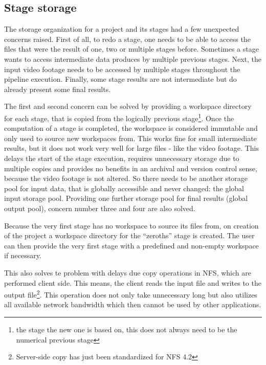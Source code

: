 \subsection{Stage storage}
\label{stage:workspace}

The storage organization for a project and its stages had a few unexpected concerns raised.
First of all, to redo a stage, one needs to be able to access the files that were the result of one, two or multiple stages before.
Sometimes a stage wants to access intermediate data produces by multiple previous stages.
Next, the input video footage needs to be accessed by multiple stages throughout the pipeline execution.
Finally, some stage results are not intermediate but do already present some final results.

The first and second concern can be solved by providing a workspace directory for each stage, that is copied from the logically previous stage\footnote{the stage the new one is based on, this does not always need to be the numerical previous stage}.
Once the computation of a stage is completed, the workspace is considered immutable and only used to source new workspaces from.
This works fine for small intermediate results, but it does not work very well for large files - like the video footage.
This delays the start of the stage execution, requires unnecessary storage due to multiple copies and provides no benefits in an archival and version control sense, because the video footage is not altered.
So there needs to be another storage pool for input data, that is globally accessible and never changed: the global input storage pool.
Providing one further storage pool for final results (global output pool), concern number three and four are also solved.

Because the very first stage has no workspace to source its files from, on creation of the project a workspace directory for the \enquote{zeroths} stage is created.
The user can then provide the very first stage with a predefined and non-empty workspace if necessary.

This also solves te problem with delays due copy operations in NFS, which are performed client side.
This means, the client reads the input file and writes to the output file\footnote{Server-side copy has just been standardized for NFS 4.2\cite{nfs:ssc}}.
This operation does not only take unnecessary long but also utilizes all available network bandwidth which then cannot be used by other applications.

